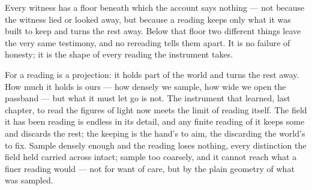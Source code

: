%
%
%
%

\noindent Every witness has a floor beneath which the account says nothing --- not because the witness lied or
looked away, but because a reading keeps only what it was built to keep and turns the rest away. Below that
floor two different things leave the very same testimony, and no rereading tells them apart. It is no failure of
honesty; it is the shape of every reading the instrument takes.

For a reading is a projection: it holds part of the world and turns the rest away. How much it holds is ours ---
how densely we sample, how wide we open the passband --- but what it must let go is not. The instrument that
learned, last chapter, to read the figures of light now meets the limit of reading itself. The field it has
been reading is endless in its detail, and any finite reading of it keeps some and discards the rest; the
keeping is the hand's to aim, the discarding the world's to fix. Sample densely enough and the reading loses
nothing, every distinction the field held carried across intact; sample too coarsely, and it cannot reach what
a finer reading would --- not for want of care, but by the plain geometry of what was sampled.

